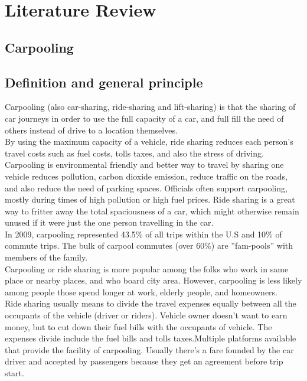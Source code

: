 \chapter{Literature Review} \label{chap:literatureReview}

\section*{Carpooling}

\section{Definition and general principle}
\justify
Carpooling (also car-sharing, ride-sharing and lift-sharing) is that the sharing of car journeys in order to use the full capacity of a car, and full ﬁll the need of others instead of drive to a location themselves.\\

By using the maximum capacity of a vehicle, ride sharing reduces each person’s travel costs such as fuel costs, tolls taxes, and also the stress of driving. Carpooling is environmental friendly and better way to travel by sharing one vehicle reduces pollution, carbon dioxide emission, reduce traﬃc on the roads, and also reduce the need of parking spaces. Officials often support carpooling, mostly during times of high pollution or high fuel prices. Ride sharing is a great way to fritter away the total spaciousness of a car, which might otherwise remain unused if it were just the one person travelling in the car.\\

In 2009, carpooling represented 43.5\% of all trips within the U.S and 10\% of commute trips. The bulk of carpool commutes (over 60\%) are ”fam-pools” with members of the family.\\

Carpooling or ride sharing is more popular among the folks who work in same place or nearby places, and who board city area. However, carpooling is less likely among people those spend longer at work, elderly people, and homeowners.\\

Ride sharing usually means to divide the travel expenses equally between all the occupants of the vehicle (driver or riders). Vehicle owner doesn’t want to earn money, but to cut down their fuel bills with the occupants of vehicle. The expenses divide include the fuel bills and tolls taxes.Multiple platforms available that provide the facility of carpooling. Usually there’s a fare founded by the car driver and accepted by passengers because they get an agreement before trip start.

